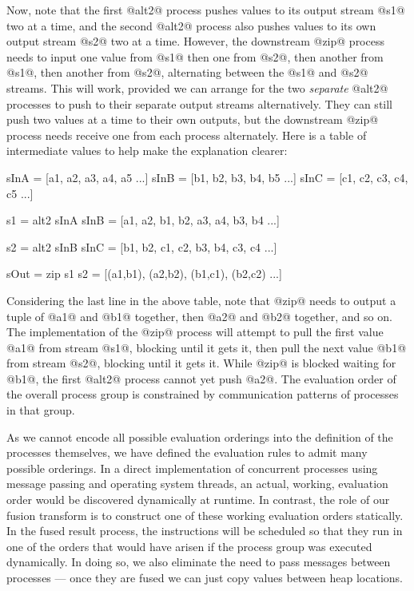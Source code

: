 Now, note that the first @alt2@ process pushes values to its output stream @s1@ two at a time, and the second @alt2@ process also pushes values to its own output stream @s2@ two at a time. However, the downstream @zip@ process needs to input one value from @s1@ then one from @s2@, then another from @s1@, then another from @s2@, alternating between the @s1@ and @s2@ streams. This will work, provided we can arrange for the two \emph{separate} @alt2@ processes to push to their separate output streams alternatively. They can still push two values at a time to their own outputs, but the downstream @zip@ process needs receive one from each process alternately. Here is a table of intermediate values to help make the explanation clearer:

\begin{code}
    sInA = [a1, a2, a3, a4, a5 ...]
    sInB = [b1, b2, b3, b4, b5 ...]
    sInC = [c1, c2, c3, c4, c5 ...]

    s1   = alt2 sInA sInB 
         = [a1, a2, b1, b2, a3, a4, b3, b4 ...]

    s2   = alt2 sInB sInC
         = [b1, b2, c1, c2, b3, b4, c3, c4 ...]

    sOut = zip s1 s2
         = [(a1,b1), (a2,b2), (b1,c1), (b2,c2) ...]
\end{code}

Considering the last line in the above table, note that @zip@ needs to output a tuple of @a1@ and @b1@ together, then @a2@ and @b2@ together, and so on. The implementation of the @zip@ process will attempt to pull the first value @a1@ from stream @s1@, blocking until it gets it, then pull the next value @b1@ from stream @s2@, blocking until it gets it. While @zip@ is blocked waiting for @b1@, the first @alt2@ process cannot yet push @a2@. The evaluation order of the overall process group is constrained by communication patterns of processes in that group.

As we cannot encode all possible evaluation orderings into the definition of the processes themselves, we have defined the evaluation rules to admit many possible orderings. In a direct implementation of concurrent processes using message passing and operating system threads, an actual, working, evaluation order would be discovered dynamically at runtime. In contrast, the role of our fusion transform is to construct one of these working evaluation orders statically. In the fused result process, the instructions will be scheduled so that they run in one of the orders that would have arisen if the process group was executed dynamically. In doing so, we also eliminate the need to pass messages between processes --- once they are fused we can just copy values between heap locations.


